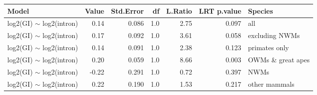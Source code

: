 \begin{table}[ht]
\centering
\begin{tabular}{lrrrrrl}
  \hline
Model & Value & Std.Error & df & L.Ratio & LRT p.value & Species \\ 
  \hline
log2(GI) $\sim$ log2(intron) & 0.14 & 0.086 & 1.0 & 2.75 & 0.097 & all \\ 
  log2(GI) $\sim$ log2(intron) & 0.17 & 0.092 & 1.0 & 3.61 & 0.058 & excluding NWMs \\ 
  log2(GI) $\sim$ log2(intron) & 0.14 & 0.091 & 1.0 & 2.38 & 0.123 & primates only \\ 
  log2(GI) $\sim$ log2(intron) & 0.20 & 0.059 & 1.0 & 8.66 & 0.003 & OWMs \& great apes \\ 
  log2(GI) $\sim$ log2(intron) & -0.22 & 0.291 & 1.0 & 0.72 & 0.397 & NWMs \\ 
  log2(GI) $\sim$ log2(intron) & 0.22 & 0.190 & 1.0 & 1.53 & 0.217 & other mammals \\ 
   \hline
\end{tabular}
\end{table}
